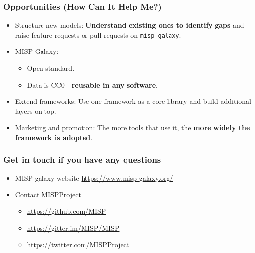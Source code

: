 \begin{frame}
        \frametitle{Opportunities (How Can It Help Me?)}
        \begin{itemize}
		\item Structure new models: {\bf Understand existing ones to identify gaps} and raise feature requests or pull requests on \texttt{misp-galaxy}.
            \item MISP Galaxy:
                \begin{itemize}
                    \item Open standard.
		    \item Data is CC0 - {\bf reusable in any software}.
                \end{itemize}
            \item Extend frameworks: Use one framework as a core library and build additional layers on top.
	    \item Marketing and promotion: The more tools that use it, the {\bf more widely the framework is adopted}.
        \end{itemize}
\end{frame}


\begin{frame}
  \frametitle{Get in touch if you have any questions}
  \begin{itemize}
    \item MISP galaxy website \url{https://www.misp-galaxy.org/}
    \item Contact MISPProject 
    \begin{itemize}
      \item \url{https://github.com/MISP}
      \item \url{https://gitter.im/MISP/MISP}
      \item \url{https://twitter.com/MISPProject}
    \end{itemize}
  \end{itemize}
\end{frame}
